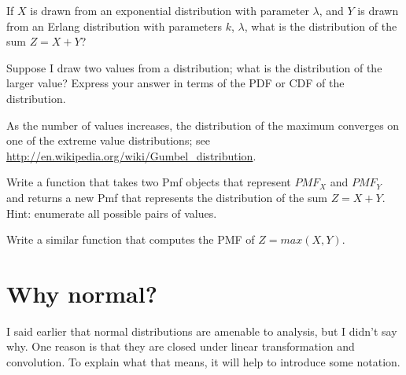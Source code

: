 \documentclass[12pt]{book}
\begin{document}
\begin{ex}


If $X$ is drawn from an exponential distribution with parameter
$\lambda$, and $Y$ is drawn from an Erlang distribution with parameters
$k$, $\lambda$, what is the distribution of the sum $Z = X+Y$?

\end{ex}

\begin{ex}


Suppose I draw two values from a distribution; what is the distribution
of the larger value?  Express your answer in terms of the PDF or CDF of
the distribution.

As the number of values increases, the distribution of the maximum
converges on one of the extreme value distributions; see
\url{http://en.wikipedia.org/wiki/Gumbel_distribution}.


\end{ex}

\begin{ex}


Write a function that takes two Pmf objects that represent $PMF_X$ and
$PMF_Y$ and returns a new Pmf that represents the distribution of
the sum $Z = X+Y$.  Hint: enumerate all possible pairs of values.

Write a similar function that computes the PMF of $Z = max(X,Y)$.

\end{ex}



\section{Why normal?}
\label{why_normal}


\newcommand{\normal}{\mathcal{N}}
\newcommand{\hasdist}{\sim}

I said earlier that normal distributions are amenable to analysis,
but I didn't say why.  One reason is that they are
closed under linear transformation and convolution.  To explain what
that means, it will help to introduce some notation.
\end{document}
